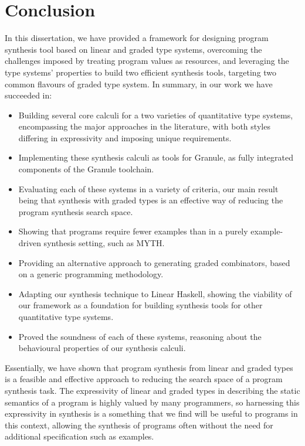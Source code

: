 \chapter{Conclusion}
\label{chapter:conclusion}
In this dissertation, we have provided a framework for designing program
synthesis tool based on linear and graded type systems, overcoming the
challenges imposed by treating program values as resources, and leveraging the
type systems' properties to build two efficient synthesis tools, targeting two
common flavours of graded type system. In summary, in our work we have succeeded
in: 
\begin{itemize}
    \item Building several core calculi for a two varieties of quantitative type
          systems, encompassing the major approaches in the literature, with
          both styles differing in expressivity and imposing unique
          requirements. 
    \item Implementing these synthesis calculi as tools for Granule, as fully integrated 
          components of the Granule toolchain. 
    \item Evaluating each of these systems in a variety of criteria, our main
          result being that synthesis with graded types is an effective way of
          reducing the program synthesis search space.  
    \item Showing that programs require fewer examples than in a purely
          example-driven synthesis setting, such as \textsc{MYTH}. 
    \item Providing an alternative approach to generating graded combinators, based on a generic programming methodology. 
    \item Adapting our synthesis technique to Linear Haskell, showing the
          viability of our framework as a foundation for building synthesis
          tools for other quantitative type systems. 
    \item Proved the soundness of each of these systems, reasoning about the
          behavioural properties of our synthesis calculi. 
\end{itemize}

Essentially, we have shown that program synthesis from linear and graded types
is a feasible and effective approach to reducing the search space of a program
synthesis task. The expressivity of linear and graded types in describing the
static semantics of a program is highly valued by many programmers, so
harnessing this expressivity in synthesis is a something that we find will be
useful to programs in this context, allowing the synthesis of programs often without
the need for additional specification such as examples.

